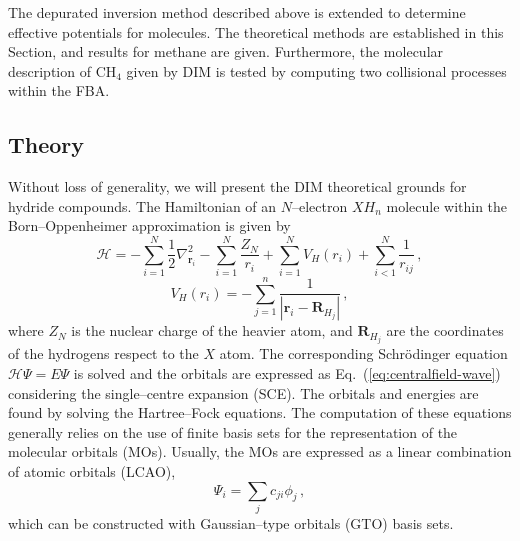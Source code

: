 \documentclass[10pt]{article}
\begin{document}
The depurated inversion method described above is extended to determine 
effective potentials for molecules. The theoretical methods are 
established in this Section, and results for methane are given. 
Furthermore, the molecular description of CH$_4$ given by DIM is 
tested by computing two collisional processes within the FBA.

\subsection{Theory}

Without loss of generality, we will present the DIM theoretical grounds 
for hydride compounds. The Hamiltonian of an $N$--electron $X\!H_n$ 
molecule within the Born--Oppenheimer approximation is given by
\begin{equation}
 \mathcal{H}=-\sum_{i=1}^N \frac{1}{2} \nabla^2_{\mathbf{r}_i} 
 - \sum_{i=1}^N \frac{Z_N}{r_i} 
 + \sum_{i=1}^N V_H(r_i)
 + \sum_{i<1}^N \frac{1}{r_{ij}}\,,
\end{equation}
\begin{equation}
 V_H(r_i) = -\sum_{j=1}^{n} \frac{1}{\left|\mathbf{r}_i-\mathbf{R}_{H_j}\right|}\,,
\end{equation}
where $Z_N$ is the nuclear charge of the heavier atom, and 
$\mathbf{R}_{H_j}$ are the coordinates of the hydrogens respect to 
the $X$ atom. The corresponding Schr\"odinger equation 
$\mathcal{H}\Psi=E\Psi$ is solved and the orbitals are expressed as
Eq.~(\ref{eq:centralfield-wave}) considering the single--centre
expansion (SCE). The orbitals and energies are found by solving the 
Hartree--Fock equations. The computation of these 
equations generally relies on the use of finite basis sets for the 
representation of the molecular orbitals (MOs). Usually, the MOs are 
expressed as a linear combination of atomic orbitals (LCAO),
\begin{equation}
 \Psi_i=\sum_j c_{ji} \phi_j\,,
\end{equation}
which can be constructed with Gaussian--type orbitals (GTO) basis 
sets. 
\end{document}
